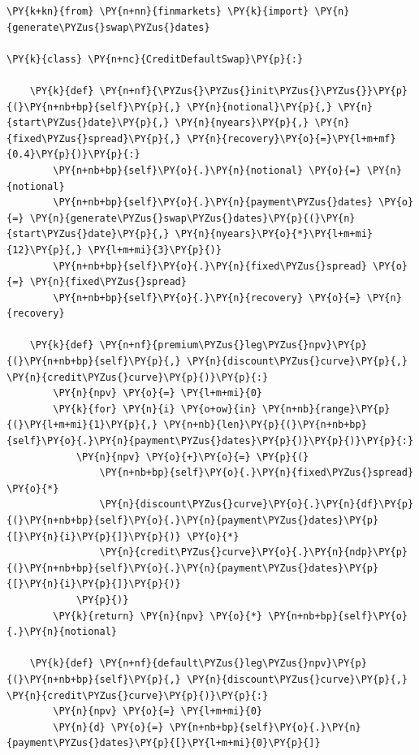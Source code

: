 \begin{tcolorbox}[breakable, size=fbox, boxrule=1pt, pad at break*=1mm,colback=cellbackground, colframe=cellborder]
\begin{Verbatim}[commandchars=\\\{\}]
\PY{k+kn}{from} \PY{n+nn}{finmarkets} \PY{k}{import} \PY{n}{generate\PYZus{}swap\PYZus{}dates}
        
\PY{k}{class} \PY{n+nc}{CreditDefaultSwap}\PY{p}{:}
    
    \PY{k}{def} \PY{n+nf}{\PYZus{}\PYZus{}init\PYZus{}\PYZus{}}\PY{p}{(}\PY{n+nb+bp}{self}\PY{p}{,} \PY{n}{notional}\PY{p}{,} \PY{n}{start\PYZus{}date}\PY{p}{,} \PY{n}{nyears}\PY{p}{,} \PY{n}{fixed\PYZus{}spread}\PY{p}{,} \PY{n}{recovery}\PY{o}{=}\PY{l+m+mf}{0.4}\PY{p}{)}\PY{p}{:}
        \PY{n+nb+bp}{self}\PY{o}{.}\PY{n}{notional} \PY{o}{=} \PY{n}{notional}
        \PY{n+nb+bp}{self}\PY{o}{.}\PY{n}{payment\PYZus{}dates} \PY{o}{=} \PY{n}{generate\PYZus{}swap\PYZus{}dates}\PY{p}{(}\PY{n}{start\PYZus{}date}\PY{p}{,} \PY{n}{nyears}\PY{o}{*}\PY{l+m+mi}{12}\PY{p}{,} \PY{l+m+mi}{3}\PY{p}{)}
        \PY{n+nb+bp}{self}\PY{o}{.}\PY{n}{fixed\PYZus{}spread} \PY{o}{=} \PY{n}{fixed\PYZus{}spread}
        \PY{n+nb+bp}{self}\PY{o}{.}\PY{n}{recovery} \PY{o}{=} \PY{n}{recovery}
    
    \PY{k}{def} \PY{n+nf}{premium\PYZus{}leg\PYZus{}npv}\PY{p}{(}\PY{n+nb+bp}{self}\PY{p}{,} \PY{n}{discount\PYZus{}curve}\PY{p}{,} \PY{n}{credit\PYZus{}curve}\PY{p}{)}\PY{p}{:}
        \PY{n}{npv} \PY{o}{=} \PY{l+m+mi}{0}
        \PY{k}{for} \PY{n}{i} \PY{o+ow}{in} \PY{n+nb}{range}\PY{p}{(}\PY{l+m+mi}{1}\PY{p}{,} \PY{n+nb}{len}\PY{p}{(}\PY{n+nb+bp}{self}\PY{o}{.}\PY{n}{payment\PYZus{}dates}\PY{p}{)}\PY{p}{)}\PY{p}{:}
            \PY{n}{npv} \PY{o}{+}\PY{o}{=} \PY{p}{(}
                \PY{n+nb+bp}{self}\PY{o}{.}\PY{n}{fixed\PYZus{}spread} \PY{o}{*}
                \PY{n}{discount\PYZus{}curve}\PY{o}{.}\PY{n}{df}\PY{p}{(}\PY{n+nb+bp}{self}\PY{o}{.}\PY{n}{payment\PYZus{}dates}\PY{p}{[}\PY{n}{i}\PY{p}{]}\PY{p}{)} \PY{o}{*}
                \PY{n}{credit\PYZus{}curve}\PY{o}{.}\PY{n}{ndp}\PY{p}{(}\PY{n+nb+bp}{self}\PY{o}{.}\PY{n}{payment\PYZus{}dates}\PY{p}{[}\PY{n}{i}\PY{p}{]}\PY{p}{)}
            \PY{p}{)}
        \PY{k}{return} \PY{n}{npv} \PY{o}{*} \PY{n+nb+bp}{self}\PY{o}{.}\PY{n}{notional}
    
    \PY{k}{def} \PY{n+nf}{default\PYZus{}leg\PYZus{}npv}\PY{p}{(}\PY{n+nb+bp}{self}\PY{p}{,} \PY{n}{discount\PYZus{}curve}\PY{p}{,} \PY{n}{credit\PYZus{}curve}\PY{p}{)}\PY{p}{:}
        \PY{n}{npv} \PY{o}{=} \PY{l+m+mi}{0}
        \PY{n}{d} \PY{o}{=} \PY{n+nb+bp}{self}\PY{o}{.}\PY{n}{payment\PYZus{}dates}\PY{p}{[}\PY{l+m+mi}{0}\PY{p}{]}
        

\end{Verbatim}
\end{tcolorbox}
